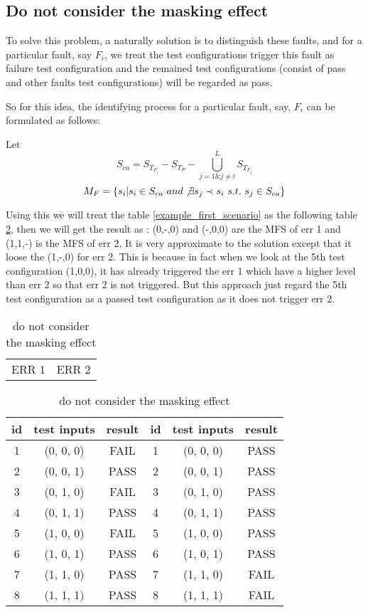 \documentclass{sig-alternate}
\begin{document}
\subsection{Do not consider the masking effect}

To solve this problem, a naturally solution is to distinguish these faults, and for a particular fault, say $F_{i}$, we treat the test configurations trigger this fault as failure test configuration and the remained test configurations (consist of pass and other faults test configurations) will be regarded as pass.

So for this idea, the identifying process for a particular fault, say, $F_{i}$ can be formulated as follows:

Let $$S_{ca} = S_{T_{F_{i}}} - S_{T_{P}} - \bigcup_{j = 1 \& j \neq i }^{L}S_{T_{F_{j}}}$$
$$M_{F} = \{s_{i} | s_{i} \in S_{ca}\ and \not\exists s_{j} \prec s_{i}\ s.t.\ s_{j} \in S_{ca} \}$$

Using this we will treat the table \ref{example_first_scenario} as the following table \ref{simple_idea}, then we will get the result as : (0,-,0) and (-,0,0) are the MFS of err 1 and (1,1,-) is the MFS of err 2. It is very approximate to the solution except that it loose the (1,-,0) for err 2. This is because in fact when we look at the 5th test configuration (1,0,0), it has already triggered the err 1 which have a higher level than err 2 so that err 2 is not triggered. But this approach just regard the 5th test configuration as a passed test configuration as it does not trigger err 2.

\begin{table}
\centering
\caption{do not consider the masking effect}
\label{simple_idea}
\begin{tabular}{p{}|p{}} \hline
   ERR 1 & ERR 2
\end{tabular}

\begin{tabular}{c|c|c|c|c|c} \hline
id &test inputs & result & id&test inputs & result\\ \hline
1 &(0, 0, 0) &  FAIL &1&(0, 0, 0) &  PASS\\ \hline
2 &(0, 0, 1) &  PASS &2&(0, 0, 1) &  PASS\\ \hline
3 &(0, 1, 0) &  FAIL &3&(0, 1, 0) &  PASS\\ \hline
4 &(0, 1, 1) &  PASS &4&(0, 1, 1) &  PASS\\ \hline
5 &(1, 0, 0) &  FAIL &5&(1, 0, 0) &  PASS\\ \hline
6 &(1, 0, 1) &  PASS &6&(1, 0, 1) &  PASS\\ \hline
7 &(1, 1, 0) &  PASS &7&(1, 1, 0) &  FAIL\\ \hline
8 &(1, 1, 1) &  PASS &8&(1, 1, 1) &  FAIL\\ \hline
\hline\end{tabular}
\end{table}
\end{document}
